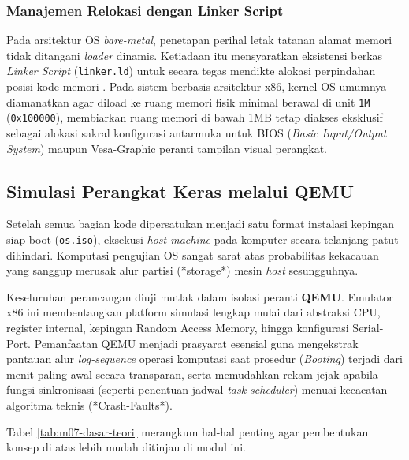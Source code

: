 \subsubsection{Manajemen Relokasi dengan Linker Script}
Pada arsitektur OS \textit{bare-metal}, penetapan perihal letak tatanan alamat memori tidak ditangani \textit{loader} dinamis. Ketiadaan itu mensyaratkan eksistensi berkas \textit{Linker Script} (\texttt{linker.ld}) untuk secara tegas mendikte alokasi perpindahan posisi kode memori \cite{bryant2015computer}. Pada sistem berbasis arsitektur x86, kernel OS umumnya diamanatkan agar diload ke ruang memori fisik minimal berawal di unit \texttt{1M} (\texttt{0x100000}), membiarkan ruang memori di bawah 1MB tetap diakses eksklusif sebagai alokasi sakral konfigurasi antarmuka untuk BIOS (\textit{Basic Input/Output System}) maupun Vesa-Graphic peranti tampilan visual perangkat.

\subsection{Simulasi Perangkat Keras melalui QEMU}
Setelah semua bagian kode dipersatukan menjadi satu format instalasi kepingan siap-boot (\texttt{os.iso}), eksekusi \textit{host-machine} pada komputer secara telanjang patut dihindari. Komputasi pengujian OS sangat sarat atas probabilitas kekacauan yang sanggup merusak alur partisi (*storage*) mesin \textit{host} sesungguhnya.

Keseluruhan perancangan diuji mutlak dalam isolasi peranti \textbf{QEMU}. Emulator x86 ini membentangkan platform simulasi lengkap mulai dari abstraksi CPU, register internal, kepingan Random Access Memory, hingga konfigurasi Serial-Port. Pemanfaatan QEMU menjadi prasyarat esensial guna mengekstrak pantauan alur \textit{log-sequence} operasi komputasi saat prosedur (\textit{Booting}) terjadi dari menit paling awal secara transparan, serta memudahkan rekam jejak apabila fungsi sinkronisasi (seperti penentuan jadwal \textit{task-scheduler}) menuai kecacatan algoritma teknis (*Crash-Faults*).

Tabel \ref{tab:m07-dasar-teori} merangkum hal-hal penting agar pembentukan konsep di atas lebih mudah ditinjau di modul ini.

